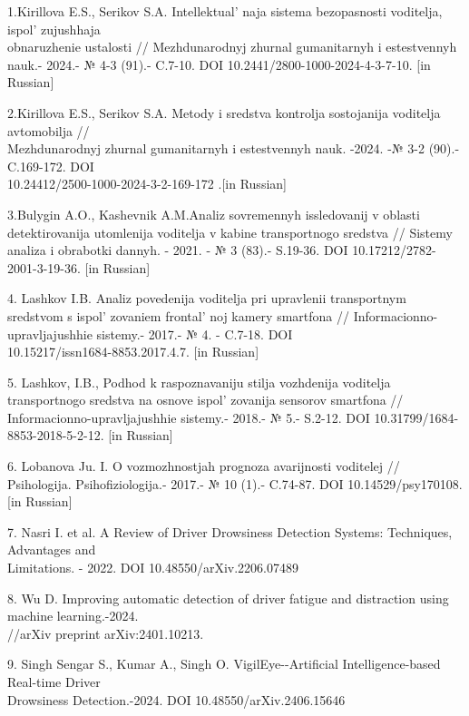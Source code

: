 \begin{references}
1.Kirillova E.S., Serikov S.A. Intellektual' naja sistema
bezopasnosti voditelja, ispol' zujushhaja \\obnaruzhenie
ustalosti // Mezhdunarodnyj zhurnal gumanitarnyh i estestvennyh nauk.-
2024.- № 4-3 (91).- C.7-10. DOI 10.2441/2800-1000-2024-4-3-7-10. {[}in
Russian{]}

2.Kirillova E.S., Serikov S.A. Metody i sredstva kontrolja sostojanija
voditelja avtomobilja // \\Mezhdunarodnyj zhurnal gumanitarnyh i
estestvennyh nauk. -2024. -№ 3-2 (90).- C.169-172. DOI\\
10.24412/2500-1000-2024-3-2-169-172 .{[}in Russian{]}

3.Bulygin A.O., Kashevnik A.M.Analiz sovremennyh issledovanij v oblasti
detektirovanija utomlenija voditelja v kabine transportnogo sredstva //
Sistemy analiza i obrabotki dannyh. - 2021. - № 3 (83).- S.19-36. DOI
10.17212/2782-2001-3-19-36. {[}in Russian{]}

4. Lashkov I.B. Analiz povedenija voditelja pri upravlenii transportnym
sredstvom s ispol' zovaniem frontal' noj
kamery smartfona // Informacionno-upravljajushhie sistemy.- 2017.- № 4.
- C.7-18. DOI \\10.15217/issn1684-8853.2017.4.7. {[}in Russian{]}

5. Lashkov, I.B., Podhod k raspoznavaniju stilja vozhdenija voditelja
transportnogo sredstva na osnove ispol' zovanija sensorov
smartfona // Informacionno-upravljajushhie sistemy.- 2018.- № 5.-
S.2-12. DOI 10.31799/1684-8853-2018-5-2-12. {[}in Russian{]}

6. Lobanova Ju. I. O vozmozhnostjah prognoza avarijnosti voditelej //
Psihologija. Psihofiziologija.- 2017.- № 10 (1).- C.74-87. DOI
10.14529/psy170108. {[}in Russian{]}

7. Nasri I. et al. A Review of Driver Drowsiness Detection Systems:
Techniques, Advantages and \\Limitations. - 2022. DOI
10.48550/arXiv.2206.07489

8. Wu D. Improving automatic detection of driver fatigue and distraction
using machine learning.-2024.\\//arXiv preprint arXiv:2401.10213.

9. Singh Sengar S., Kumar A., Singh O. VigilEye-\/-Artificial
Intelligence-based Real-time Driver \\Drowsiness Detection.-2024. DOI
10.48550/arXiv.2406.15646


\end{references}
